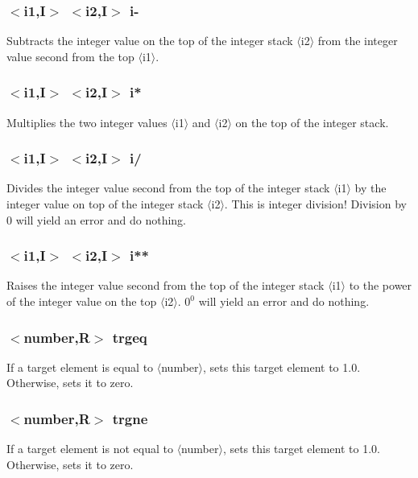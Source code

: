 \documentclass[a4paper,10pt]{report}
\begin{document}
\subsubsection{$<$i1,{\bf I}$>$ $<$i2,{\bf I}$>$ i-}\label{sec:i-}
Subtracts the integer value on the top of the integer stack $\langle$i2$\rangle$ from the integer value
second from the top $\langle$i1$\rangle$.

\subsubsection{$<$i1,{\bf I}$>$ $<$i2,{\bf I}$>$ i*}\label{sec:i*}
Multiplies the two integer values $\langle$i1$\rangle$ and $\langle$i2$\rangle$ on the top of the integer stack.

\subsubsection{$<$i1,{\bf I}$>$ $<$i2,{\bf I}$>$ i/}\label{sec:i/}
Divides the integer value second from the top of the integer stack $\langle$i1$\rangle$ by the integer value on top of the integer stack $\langle$i2$\rangle$. This is integer division! Division by 0 will yield an error and do nothing.

\subsubsection{$<$i1,{\bf I}$>$ $<$i2,{\bf I}$>$ i**}\label{sec:i**}
Raises the integer value second from the top of the integer stack $\langle$i1$\rangle$ to the power of
the integer value on the top $\langle$i2$\rangle$. $0^0$ will yield an error and do nothing.

\subsubsection{$<$number,{\bf R}$>$ trgeq}\label{sec:trgeq}
If a target element is equal to $\langle$number$\rangle$, sets this target element to 1.0.
Otherwise, sets it to zero.

\subsubsection{$<$number,{\bf R}$>$ trgne}\label{sec:trgne}
If a target element is not equal to $\langle$number$\rangle$, sets this target element to 1.0.
Otherwise, sets it to zero.
\end{document}
